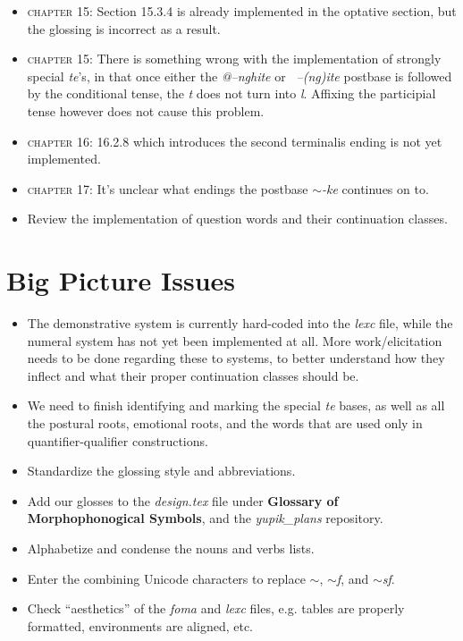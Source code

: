 \documentclass{article}
\begin{document}
\begin{itemize}
\item \textsc{chapter 15}: Section 15.3.4 is already implemented in the optative section, but the glossing is incorrect as a result.

\item \textsc{chapter 15}: There is something wrong with the implementation of strongly special \textit{te}'s, in that once either the \textit{@--nghite} or \textit{~--(ng)ite} postbase is followed by the conditional tense, the \textit{t} does not turn into \textit{l}.
%
Affixing the participial tense however does not cause this problem.

\item \textsc{chapter 16}: 16.2.8 which introduces the second terminalis ending is not yet implemented.

\item \textsc{chapter 17}: It's unclear what endings the postbase \textit{$\sim$-ke} continues on to.

\item Review the implementation of question words and their continuation classes.

\end{itemize}


\section{Big Picture Issues}

\begin{itemize}
\renewcommand\labelitemi{$\cdot$}

\item The demonstrative system is currently hard-coded into the \textit{lexc} file, while the numeral system has not yet been implemented at all.
%
More work/elicitation needs to be done regarding these to systems, to better understand how they inflect and what their proper continuation classes should be.

\item We need to finish identifying and marking the special \textit{te} bases, as well as all the postural roots, emotional roots, and the words that are used only in quantifier-qualifier constructions.

\item Standardize the glossing style and abbreviations.

\item Add our glosses to the \textit{design.tex} file under \textbf{Glossary of Morphophonogical Symbols}, and the \textit{yupik\_plans} repository.

\item Alphabetize and condense the nouns and verbs lists.

\item Enter the combining Unicode characters to replace \textit{$\sim$}, \textit{$\sim$f}, and \textit{$\sim$sf}.

\item Check ``aesthetics'' of the \textit{foma} and \textit{lexc} files, e.g. tables are properly formatted, environments are aligned, etc.

\end{itemize}
\end{document}

